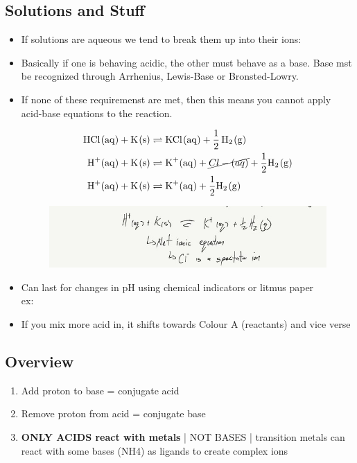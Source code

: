 \documentclass{article}
\begin{document}
\subsection{Solutions and Stuff}
\begin{itemize} \item If solutions are aqueous we tend to break them up into their ions: \\ \item Basically if one is behaving acidic, the other must behave as a base. Base mst be recognized through Arrhenius, Lewis-Base or Bronsted-Lowry. \item If none of these requiremenst are met, then this means you cannot apply acid-base equations to the reaction.  \\\begin{center}
\begin{align*}
\ce{HCl(aq) + K(s)} &\rightleftharpoons \ce{KCl(aq) + \frac{1}{2} H2(g)}\\
\ce{H+(aq) + K(s)} &\rightleftharpoons \ce{K+(aq) + \cancel{Cl-(aq)} + \frac{1}{2}H2(g)}\\
\ce{H+(aq) + K(s)} &\rightleftharpoons \ce{K+(aq) + \frac{1}{2}H2(g)}
\end{align*}
\end{center}
\begin{figure}[H]
\includegraphics[width=\textwidth]{4.1fig2.jpg}
\end{figure}

\item Can last for changes in pH using chemical indicators or litmus paper\\ex: 
\item If you mix more acid in, it shifts towards Colour A (reactants) and vice verse
\end{itemize}

\pagebreak
\subsection{Overview}
\begin{enumerate}
\item Add proton to base = conjugate acid
\item Remove proton from acid = conjugate base
\item \textbf{ONLY ACIDS react with metals} | NOT BASES | transition metals can react with some bases (NH4) as ligands to create complex ions
\end{enumerate}
\end{document}
